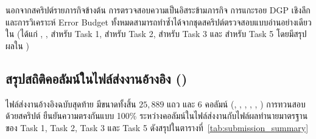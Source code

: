 นอกจากสคริปต์รายภารกิจข้างต้น การตรวจสอบความเป็นอิสระข้ามภารกิจ การแกะรอย DGP เชิงลึก และการวิเคราะห์ Error Budget ทั้งหมดสามารถทำซ้ำได้จากชุดสคริปต์ตรวจสอบแบบอ่านอย่างเดียวใน  (ได้แก่ , ,  สำหรับ Task 1,  สำหรับ Task 2,  สำหรับ Task 3 และ  สำหรับ Task 5 โดยมีสรุปผลใน )

\subsection{สรุปสถิติคอลัมน์ในไฟล์ส่งงานอ้างอิง (\texorpdfstring{\protect{}}{sub\_v85a\_soup\_trainprior.csv})}
\label{subsec:submission_summary}

ไฟล์ส่งงานอ้างอิงฉบับสุดท้าย  มีขนาดทั้งสิ้น $25{,}889$ แถว และ $6$ คอลัมน์ (, , , , , ) การทวนสอบด้วยสคริปต์  ยืนยันความตรงกันแบบ 100\% ระหว่างคอลัมน์ในไฟล์ส่งงานกับไฟล์ผลทำนายมาตรฐานของ Task 1, Task 2, Task 3 และ Task 5 ดังสรุปในตารางที่~\ref{tab:submission_summary}

